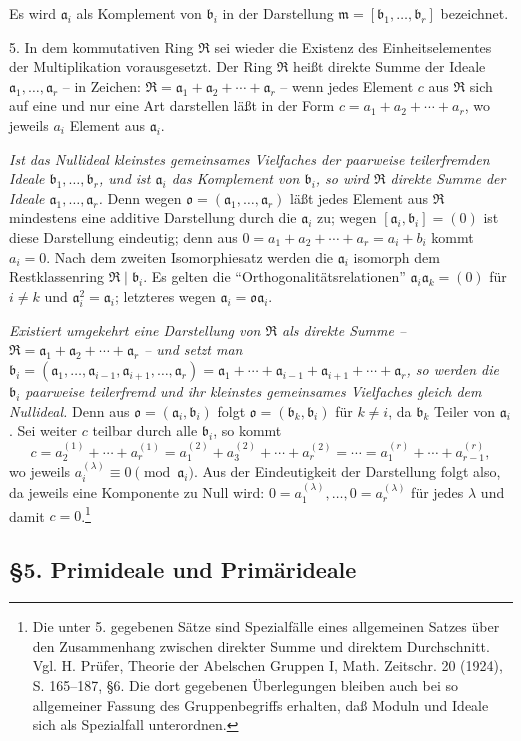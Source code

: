 \documentclass[11pt]{article}
\providecommand{\mR}{\mathfrak{R}}
\providecommand{\ma}{\mathfrak{a}}
\providecommand{\mb}{\mathfrak{b}}
\providecommand{\mm}{\mathfrak{m}}
\providecommand{\mo}{\mathfrak{o}}
\begin{document}
Es wird $\ma_i$ als Komplement von $\mb_i$ in der Darstellung $\mm=[\mb_1,\ldots,\mb_r]$ bezeichnet.

5. In dem kommutativen Ring $\mR$ sei wieder die Existenz des Einheitselementes der Multiplikation vorausgesetzt. Der Ring $\mR$ heißt direkte Summe der Ideale $\ma_1,\ldots,\ma_r$ -- in Zeichen: $\mR=\ma_1+\ma_2+\cdots+\ma_r$ -- wenn jedes Element $c$ aus $\mR$ sich auf eine und nur eine Art darstellen läßt in der Form $c=a_1+a_2+\cdots+a_r$, wo jeweils $a_i$ Element aus $\ma_i$.

\emph{Ist das Nullideal kleinstes gemeinsames Vielfaches der paarweise teilerfremden Ideale $\mb_1,\ldots,\mb_r$, und ist $\ma_i$ das Komplement von $\mb_i$, so wird $\mR$ direkte Summe der Ideale $\ma_1,\ldots,\ma_r$.} Denn wegen $\mo=(\ma_1,\ldots,\ma_r)$ läßt jedes Element aus $\mR$ mindestens eine additive Darstellung durch die $\ma_i$ zu; wegen $[\ma_i,\mb_i]=(0)$ ist diese Darstellung eindeutig; denn aus $0=a_1+a_2+\cdots+a_r=a_i+b_i$ kommt $a_i=0$. Nach dem zweiten Isomorphiesatz werden die $\ma_i$ isomorph dem Restklassenring $\mR\mid\mb_i$. Es gelten die ``Orthogonalitätsrelationen'' $\ma_i\ma_k=(0)$ für $i\ne k$ und $\ma_i^2=\ma_i$; letzteres wegen $\ma_i=\mo\ma_i$.

\emph{Existiert umgekehrt eine Darstellung von $\mR$ als direkte Summe -- $\mR=\ma_1+\ma_2+\cdots+\ma_r$ -- und setzt man $\mb_i=(\ma_1,\ldots,\ma_{i-1},\ma_{i+1},\ldots,\ma_r)=\ma_1+\cdots+\ma_{i-1}+\ma_{i+1}+\cdots+\ma_r$, so werden die $\mb_i$ paarweise teilerfremd und ihr kleinstes gemeinsames Vielfaches gleich dem Nullideal.} Denn aus $\mo=(\ma_i,\mb_i)$ folgt $\mo=(\mb_k,\mb_i)$ für $k\ne i$, da $\mb_k$ Teiler von $\ma_i$. Sei weiter $c$ teilbar durch alle $\mb_i$, so kommt
\[
 c=a_2^{(1)}+\cdots+a_r^{(1)}=a_1^{(2)}+a_3^{(2)}+\cdots+a_r^{(2)}=\cdots=a_1^{(r)}+\cdots+a_{r-1}^{(r)},
\]
wo jeweils $a_i^{(\lambda)}\equiv0\pmod{\ma_i}$. Aus der Eindeutigkeit der Darstellung folgt also, da jeweils eine Komponente zu Null wird: $0=a_1^{(\lambda)},\ldots,0=a_r^{(\lambda)}$ für jedes $\lambda$ und damit $c=0$.\footnote{Die unter 5. gegebenen Sätze sind Spezialfälle eines allgemeinen Satzes über den Zusammenhang zwischen direkter Summe und direktem Durchschnitt. Vgl. H. Prüfer, Theorie der Abelschen Gruppen I, Math. Zeitschr. 20 (1924), S. 165--187, §6. Die dort gegebenen Überlegungen bleiben auch bei so allgemeiner Fassung des Gruppenbegriffs erhalten, daß Moduln und Ideale sich als Spezialfall unterordnen.}

\subsection*{§5. Primideale und Primärideale}
\end{document}
